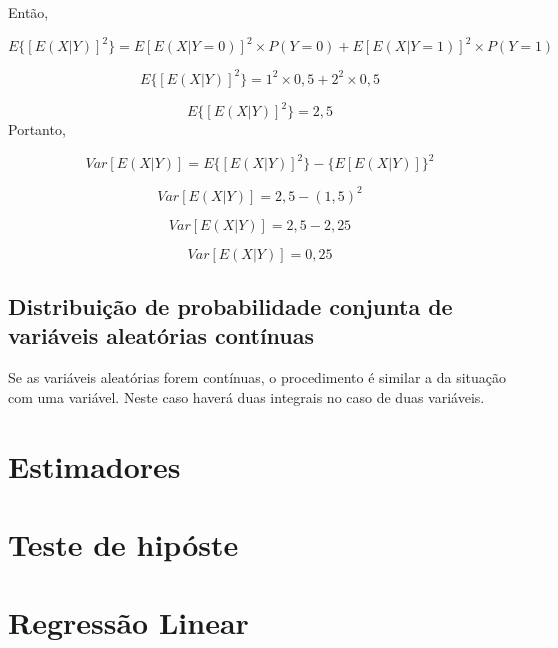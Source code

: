 \documentclass[
]{book}
\begin{document}
Então,

\[
  E\{[E(X|Y)]^2\} = E[E(X|Y=0)]^2\times P(Y=0) + E[E(X|Y=1)]^2\times P(Y=1) 
\]

\[
  E\{[E(X|Y)]^2\} = 1^2\times 0,5 + 2^2\times 0,5 
\]

\[
  E\{[E(X|Y)]^2\} = 2,5 
\]
Portanto,

\[
  Var[E(X|Y)] = E\{[E(X|Y)]^2\} - \{E[E(X|Y)]\}^2 
\]

\[
  Var[E(X|Y)] = 2,5 - (1,5)^2 
\]

\[
  Var[E(X|Y)] = 2,5 - 2,25 
\]

\[
  Var[E(X|Y)] = 0,25
\]

\hypertarget{distribuiuxe7uxe3o-de-probabilidade-conjunta-de-variuxe1veis-aleatuxf3rias-contuxednuas}{%
\section{Distribuição de probabilidade conjunta de variáveis aleatórias contínuas}\label{distribuiuxe7uxe3o-de-probabilidade-conjunta-de-variuxe1veis-aleatuxf3rias-contuxednuas}}

Se as variáveis aleatórias forem contínuas, o procedimento é similar a da situação com uma variável. Neste caso haverá duas integrais no caso de duas variáveis.

\hypertarget{estimadores}{%
\chapter{Estimadores}\label{estimadores}}

\hypertarget{teste-de-hipuxf3ste}{%
\chapter{Teste de hipóste}\label{teste-de-hipuxf3ste}}

\hypertarget{regressuxe3o-linear}{%
\chapter{Regressão Linear}\label{regressuxe3o-linear}}

  
\end{document}
